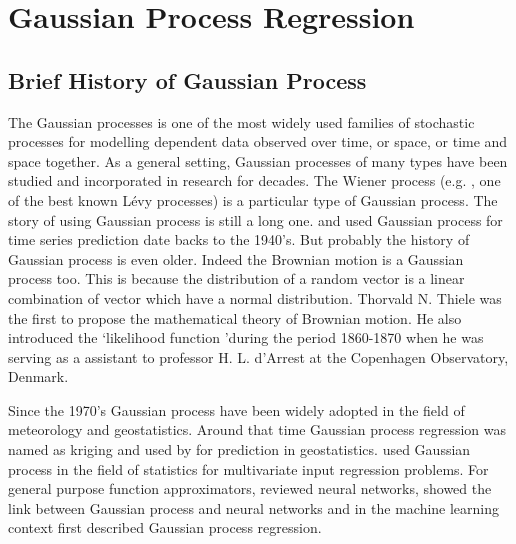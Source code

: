 
\chapter{Gaussian Process Regression} \label{ch:GaussianProcessRegression}

\ifpdf
    \graphicspath{{Chapter3/Figs/Raster/}{Chapter3/Figs/PDF/}{Chapter3/Figs/}}
\else
    \graphicspath{{Chapter3/Figs/Vector/}{Chapter3/Figs/}}
\fi

\section{Brief History of Gaussian Process}
The Gaussian processes is one of the most widely used families of stochastic processes for modelling dependent data observed over time, or space, or time and space together. As a general setting, Gaussian processes of many types have been studied and incorporated in research for decades. The Wiener process (e.g. \cite{Papoulis:1991}, one of the best known L\'{e}vy processes) is a particular type of Gaussian process. The story of using Gaussian process is still a long one. \cite{Kolmogorov:1941} and \cite{Wiener:1949} used Gaussian process for time series prediction date backs to the 1940's. But probably the history of Gaussian process is even older. Indeed the Brownian motion is a Gaussian process too. This is because the distribution of a random vector is a linear combination of vector which have a normal distribution. Thorvald N. Thiele was the first to propose the mathematical theory of Brownian motion. He also introduced the \lq likelihood function \rq during the period 1860-1870 when he was serving as a assistant to professor H. L. d'Arrest at the Copenhagen Observatory, Denmark. 

Since the 1970's Gaussian process have been widely adopted in the field of meteorology and geostatistics. Around that time Gaussian process regression was named as kriging and used by \cite{Matheron:1973} for prediction in geostatistics. \cite{O'Hagan:1978} used Gaussian process in the field of statistics for multivariate input regression problems. For general purpose function approximators, \cite{Bishop:1995} reviewed neural networks, \cite{Neal:1996} showed the link between Gaussian process and neural networks and in the machine learning context \cite{Williams_and_Rasmussen:1996} first described Gaussian process regression. 

